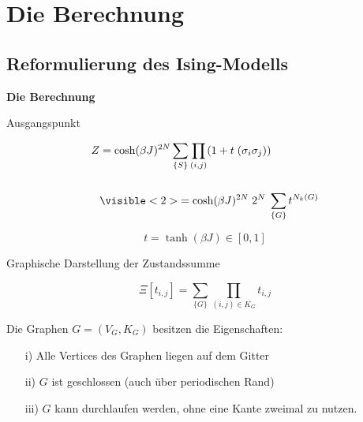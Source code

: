 \documentclass[11pt]{beamer}
\begin{document}
\section{Die Berechnung}
\subsection{Reformulierung des Ising-Modells}
    
    \begin{frame}
        \centering
        \LARGE
        \textbf{Die Berechnung}
    \end{frame}
    
    \begin{frame}{Ausgangspunkt}
        \begin{grayframe}[frametitle = {Hochtemperatur Darstellung}]
            \begin{align} \nonumber
             Z & = \cosh(\beta J)^{2N} \sum_{\{S\}} \prod_{(i,j)} (1 +  t \; (\sigma_i \sigma_j)) \\ \nonumber
             \\ \nonumber
            & \visible<2>{= \cosh(\beta J)^{2N} \; 2^N \; \sum_{\{G\}} t^{N_k(G)}  }
            \end{align}
        \end{grayframe}  
        \centering
        
        \vspace{0.5cm}
        
        $$ t = \tanh(\beta J)\in [0,1]$$

    \end{frame}
    
    \begin{frame}{Graphische Darstellung der Zustandssumme}
    
    \begin{grayframe}
    \begin{equation} \nonumber
    \Xi [t_{i,j}] =  \sum_{\{G\}} \prod_{(i,j)\in K_{G}} t_{i,j}
    \end{equation} 
    \end{grayframe}
    \vspace{0.3cm}
    Die Graphen $G = (V_G, K_G)$ besitzen die Eigenschaften: 
    \begin{itemize}
    \item[i)] Alle Vertices des Graphen liegen auf dem Gitter
    \item[ii)] $G$ ist geschlossen (auch über periodischen Rand)
    \item[iii)] $G$ kann durchlaufen werden, ohne eine Kante zweimal zu nutzen. 
    \end{itemize}
    
    \begin{figure}[h!]
        \centering
        \begin{tikzpicture}[scale = 0.8]
        
        \end{tikzpicture}
        \label{Abb: erlaubte Graphen}
    \end{figure}
    \end{frame}
    
\end{document}
